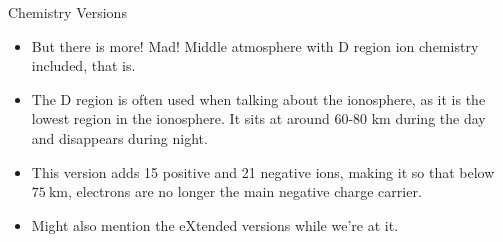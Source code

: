 \documentclass[xcolor=dvipsnames]{beamer} %
\begin{document}
\begin{frame}{Chemistry Versions}
{\begin{itemize}
			\item But there is more! Mad! Middle atmosphere with D region ion chemistry
			      included, that is.
			\item The D region is often used when talking about the ionosphere, as it is
			      the lowest region in the ionosphere. It sits at around 60-80 km during
			      the day and disappears during night.
			\item This version adds 15 positive and 21 negative ions, making it so that
			      below $ \SI{75}{\kilo\metre} $, electrons are no longer the main
			      negative charge carrier.
			\item Might also mention the eXtended versions while we're at it.
		\end{itemize}
	}
\end{frame}
\end{document}
